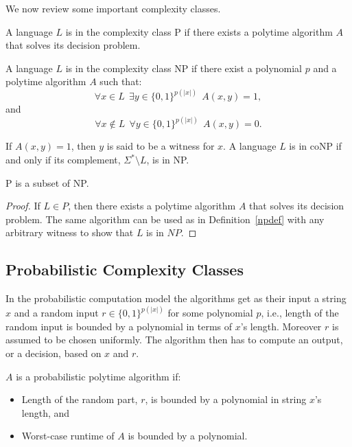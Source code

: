 We now review some important complexity classes.
\begin{definition}[P] \label{pdef} A language $L$ is in the complexity class P if there exists a polytime algorithm $A$ that solves its decision problem.
\end{definition}

\begin{definition}\label{npdef} A language $L$ is in the complexity class NP if there exist a polynomial $p$ and a polytime algorithm $A$ such that:
$$\forall x \in L ~~ \exists y \in \{0, 1\}^{p(\vert x \vert )} ~~ A(x, y) = 1,$$ and 
$$\forall x \not \in L ~~ \forall y \in \{0, 1\}^{p(\vert x \vert )} ~~ A(x, y) = 0.$$

If $A(x, y) = 1$, then $y$ is said to be a witness for $x$. A language $L$ is in coNP if and only if its complement, $\Sigma^* \setminus L$, is in NP.
\end{definition}

\begin{proposition}
P is a subset of NP.
\end{proposition}
\begin{proof}
If $L \in P$, then there exists a polytime algorithm $A$ that solves its decision problem. The same algorithm can be used as in Definition~\ref{npdef} with any arbitrary witness to show that $L$ is in $NP$.
\end{proof}

\subsection{Probabilistic Complexity Classes}
In the probabilistic computation model the algorithms get as their input a string $x$ and a random input $r \in \{0, 1\}^{p(\vert x \vert)}$ for some polynomial $p$, i.e., length of the random input is bounded by a polynomial in terms of $x$'s length. Moreover $r$ is assumed to be chosen uniformly. The algorithm then has to compute an output, or a decision, based on $x$ and $r$.

\begin{definition}
$A$ is a probabilistic polytime algorithm if:
\begin{itemize}
\item Length of the random part, $r$, is bounded by a polynomial in string $x$'s length, and
\item Worst-case runtime of $A$ is bounded by a polynomial.\qedhere
\end{itemize}
\end{definition}

